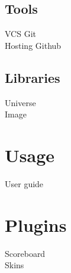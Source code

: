 \documentclass{article}
\begin{document}
 \subsection{Tools}
 VCS Git \\
Hosting Github

\subsection{Libraries}
Universe \\
Image

 \section{Usage}
 User guide

 \section{Plugins}
 Scoreboard \\
 Skins
\end{document}
